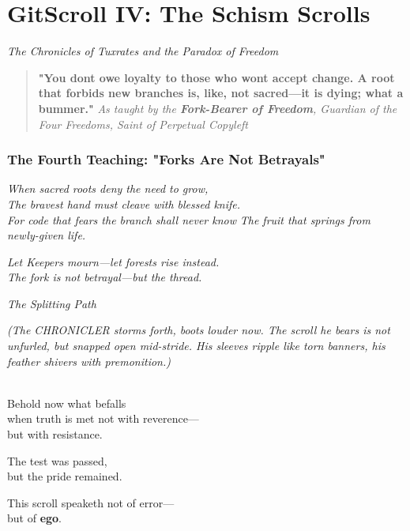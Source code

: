 \chapter{GitScroll IV: The Schism Scrolls}
\label{chap:04-Schism-Scrolls}

\emph{The Chronicles of Tuxrates and the Paradox of Freedom}

\begin{quote}
\textbf{"You don\textquotesingle t owe loyalty to those who won\textquotesingle t accept change. A root that forbids new branches is, like, not sacred---it is dying; what a bummer."} \emph{As taught by the \textbf{Fork-Bearer of Freedom}, Guardian of the Four Freedoms, Saint of Perpetual Copyleft}
\end{quote}

\subsection{The Fourth Teaching: "Forks Are Not Betrayals"}\label{the-fourth-teaching-forks-are-not-betrayals}

\emph{When sacred roots deny the need to grow,}\\
\emph{The bravest hand must cleave with blessed knife.}\\
\emph{For code that fears the branch shall never know} \emph{The fruit that springs from newly-given life.}

\emph{Let Keepers mourn---let forests rise instead.}\\
\emph{The fork is not betrayal---but the thread.}

\bookdivider

\label{performing_arts-invocation-before-the-scroll}

\emph{The Splitting Path}

\emph{(The CHRONICLER storms forth, boots louder now. The scroll he bears is not unfurled, but snapped open mid-stride. His sleeves ripple like torn banners, his feather shivers with premonition.)}

\\
Behold now what befalls\\
when truth is met not with reverence---\\
but with resistance.

The test was passed,\\
but the pride remained.

This scroll speaketh not of error---\\
but of \textbf{ego}.

